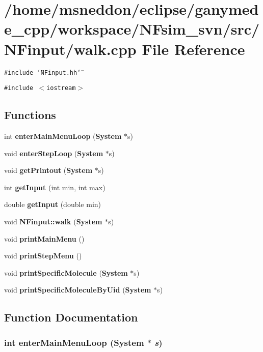 \section{/home/msneddon/eclipse/ganymede\_\-cpp/workspace/NFsim\_\-svn/src/NFinput/walk.cpp File Reference}
\label{walk_8cpp}


{\tt \#include \char`\"{}NFinput.hh\char`\"{}}\par
{\tt \#include $<$iostream$>$}\par
\subsection*{Functions}
\begin{CompactItemize}
\item 
int {\bf enterMainMenuLoop} ({\bf System} $\ast$s)
\item 
void {\bf enterStepLoop} ({\bf System} $\ast$s)
\item 
void {\bf getPrintout} ({\bf System} $\ast$s)
\item 
int {\bf getInput} (int min, int max)
\item 
double {\bf getInput} (double min)
\item 
void {\bf NFinput::walk} ({\bf System} $\ast$s)
\item 
void {\bf printMainMenu} ()
\item 
void {\bf printStepMenu} ()
\item 
void {\bf printSpecificMolecule} ({\bf System} $\ast$s)
\item 
void {\bf printSpecificMoleculeByUid} ({\bf System} $\ast$s)
\end{CompactItemize}


\subsection{Function Documentation}
\subsubsection{\setlength{\rightskip}{0pt plus 5cm}int enterMainMenuLoop ({\bf System} $\ast$ {\em s})}\label{walk_8cpp_863793acef9098334f0848f1248f1751}


